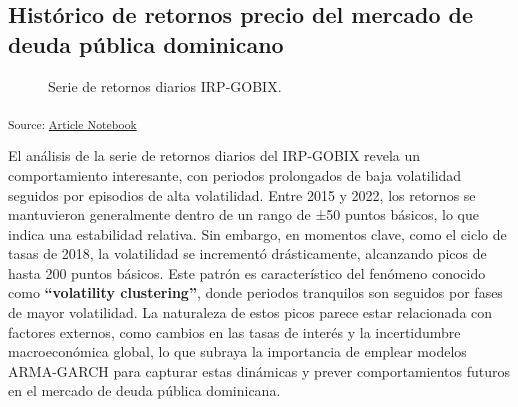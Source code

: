 \documentclass[
  number,
  preprint,
  3p,
  onecolumn]{elsarticle}
\begin{document}
\subsection{Histórico de retornos precio del mercado de deuda pública
dominicano}\label{sec-historico-retornos}

\begin{figure}[H]


\caption{\label{fig-price-return-series}Serie de retornos diarios
IRP-GOBIX.}

\end{figure}%

\textsubscript{Source:
\href{https://iancont.github.io/fixed_income_garch/index.qmd.html}{Article
Notebook}}

El análisis de la serie de retornos diarios del IRP-GOBIX revela un
comportamiento interesante, con periodos prolongados de baja volatilidad
seguidos por episodios de alta volatilidad. Entre 2015 y 2022, los
retornos se mantuvieron generalmente dentro de un rango de ±50 puntos
básicos, lo que indica una estabilidad relativa. Sin embargo, en
momentos clave, como el ciclo de tasas de 2018, la volatilidad se
incrementó drásticamente, alcanzando picos de hasta 200 puntos básicos.
Este patrón es característico del fenómeno conocido como
\textbf{``volatility clustering''}, donde periodos tranquilos son
seguidos por fases de mayor volatilidad. La naturaleza de estos picos
parece estar relacionada con factores externos, como cambios en las
tasas de interés y la incertidumbre macroeconómica global, lo que
subraya la importancia de emplear modelos ARMA-GARCH para capturar estas
dinámicas y prever comportamientos futuros en el mercado de deuda
pública dominicana.
\end{document}
